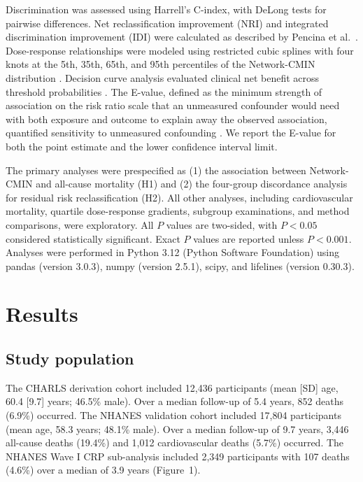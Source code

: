 \documentclass[11pt,a4paper]{article}
\begin{document}
Discrimination was assessed using Harrell's C-index, with DeLong tests for pairwise differences. Net reclassification improvement (NRI) and integrated discrimination improvement (IDI) were calculated as described by Pencina et al.\ \cite{pencina2008nri}. Dose-response relationships were modeled using restricted cubic splines with four knots at the 5th, 35th, 65th, and 95th percentiles of the Network-CMIN distribution \cite{desquilbet2010rcs}. Decision curve analysis evaluated clinical net benefit across threshold probabilities \cite{vickers2006dca}. The E-value, defined as the minimum strength of association on the risk ratio scale that an unmeasured confounder would need with both exposure and outcome to explain away the observed association, quantified sensitivity to unmeasured confounding \cite{vanderweele2017evalue}. We report the E-value for both the point estimate and the lower confidence interval limit.

The primary analyses were prespecified as (1) the association between Network-CMIN and all-cause mortality (H1) and (2) the four-group discordance analysis for residual risk reclassification (H2). All other analyses, including cardiovascular mortality, quartile dose-response gradients, subgroup examinations, and method comparisons, were exploratory. All $P$ values are two-sided, with $P < 0.05$ considered statistically significant. Exact $P$ values are reported unless $P < 0.001$. Analyses were performed in Python 3.12 (Python Software Foundation) using pandas (version 3.0.3), numpy (version 2.5.1), scipy, and lifelines (version 0.30.3).

\section{Results}

\subsection{Study population}

The CHARLS derivation cohort included 12,436 participants (mean [SD] age, 60.4 [9.7] years; 46.5\% male). Over a median follow-up of 5.4 years, 852 deaths (6.9\%) occurred. The NHANES validation cohort included 17,804 participants (mean age, 58.3 years; 48.1\% male). Over a median follow-up of 9.7 years, 3,446 all-cause deaths (19.4\%) and 1,012 cardiovascular deaths (5.7\%) occurred. The NHANES Wave I CRP sub-analysis included 2,349 participants with 107 deaths (4.6\%) over a median of 3.9 years (Figure~1).
\end{document}
